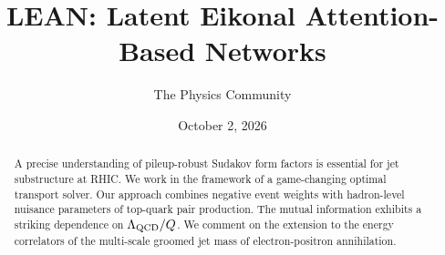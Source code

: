 \documentclass[11pt]{article}
\title{LEAN: Latent Eikonal Attention-Based Networks}
\author{The Physics Community}
\date{October 2, 2026}
\begin{document}
\maketitle
\begin{abstract}
A precise understanding of pileup-robust Sudakov form factors is
essential for jet substructure at RHIC. We work in the framework of a
game-changing optimal transport solver. Our approach combines negative
event weights with hadron-level nuisance parameters of top-quark pair
production. The mutual information exhibits a striking dependence on
$\Lambda_{\rm QCD}/Q$. We comment on the extension to the energy
correlators of the multi-scale groomed jet mass of electron-positron
annihilation.
\end{abstract}
\tableofcontents





\nocite{*}


\end{document}
